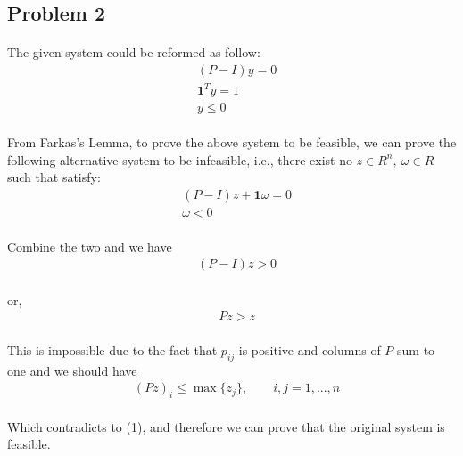 \subsection*{Problem 2}
\paragraph{}
The given system could be reformed as follow:
\begin{align*}
& (P - I)y = 0 \\
& \textbf{1}^T y = 1 \\
& y \leq 0
\end{align*}
\paragraph{}
From Farkas's Lemma, to prove the above system to be feasible, we can prove the following alternative system to be infeasible, i.e., there exist no $z \in R^n,\ \omega \in R$ such that satisfy:
\begin{align*}
& (P - I)z + \textbf{1}\omega = 0 \\
& \omega < 0 
\end{align*}
\paragraph{}
Combine the two and we have
\begin{align*}
& (P - I)z > 0
\end{align*}
\paragraph{}
or,
\begin{align}
& Pz > z
\end{align}
\paragraph{}
This is impossible due to the fact that $p_{ij}$ is positive and columns of $P$ sum to one and we should have
\begin{align*}
& (Pz)_i \leq \max\{z_j\}, \qquad i,j =1,...,n
\end{align*}
\paragraph{}
Which contradicts to (1), and therefore we can prove that the original system is feasible.